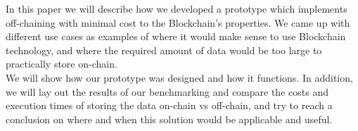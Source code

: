 In this paper we will describe how we developed a prototype which implements off-chaining with minimal cost to the Blockchain’s properties. We came up with different use cases as examples of where it would make sense to use Blockchain technology, and where the required amount of data would be too large to practically store on-chain.\\
We will show how our prototype was designed and how it functions. In addition, we will lay out the results of our benchmarking and compare the costs and execution times of storing the data on-chain vs off-chain, and try to reach a conclusion on where and when this solution would be applicable and useful. 


\newpage
